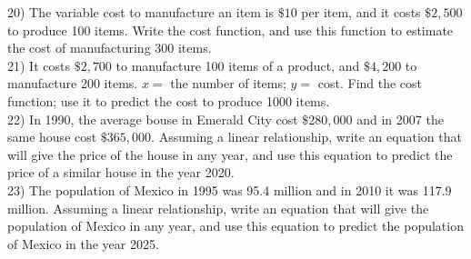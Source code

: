 20) The variable cost to manufacture an item is $\$ 10$ per item, and it costs $\$ 2,500$ to produce 100 items. Write the cost function, and use this function to estimate the cost of manufacturing 300 items.\\
21) It costs $\$ 2,700$ to manufacture 100 items of a product, and $\$ 4,200$ to manufacture 200 items. $x=$ the number of items; $y=$ cost. Find the cost function; use it to predict the cost to produce 1000 items.\\
22) In 1990, the average bouse in Emerald City cost $\$ 280,000$ and in 2007 the same house cost $\$ 365,000$. Assuming a linear relationship, write an equation that will give the price of the house in any year, and use this equation to predict the price of a similar house in the year 2020.\\
23) The population of Mexico in 1995 was 95.4 million and in 2010 it was 117.9 million. Assuming a linear relationship, write an equation that will give the population of Mexico in any year, and use this equation to predict the population of Mexico in the year 2025.

